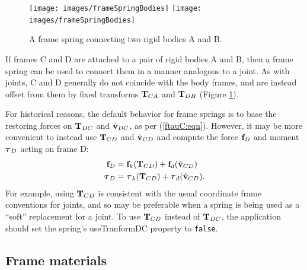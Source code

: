 \begin{figure}[ht]
\begin{center}
 \iflatexml
   \texttt{[image: images/frameSpringBodies]}
 \else
   \texttt{[image: images/frameSpringBodies]}
 \fi
\end{center}
\caption{A frame spring connecting two rigid bodies A and B.}
\label{frameSpringBodies:fig}
\end{figure}

If frames C and D are attached to a pair of rigid bodies A and B, then
a frame spring can be used to connect them in a manner analogous to a
joint. As with joints, C and D generally do not coincide with the body
frames, and are instead offset from them by fixed transforms ${\bf T}_{CA}$
and ${\bf T}_{DB}$ (Figure \ref{frameSpringBodies:fig}).

\begin{sideblock}

For historical reasons, the default behavior for frame springs is to base the
restoring forces on ${\bf T}_{DC}$ and $\hat{{\bf v}}_{DC}$, as per (\ref{ftauC:eqn}).
However, it may be more convenient to instead use ${\bf T}_{CD}$ and $\hat{{\bf v}}_{CD}$
and compute the force ${\bf f}_D$ and moment $\boldsymbol\tau_D$ acting on frame D:
%
\begin{align}
{\bf f}_D & = {\bf f}_{k} ({\bf T}_{CD}) + {\bf f}_{d} (\hat{{\bf v}}_{CD}) \notag \\
\boldsymbol\tau_D & = \boldsymbol\tau_{k} ({\bf T}_{CD}) + \boldsymbol\tau_{d} (\hat{{\bf v}}_{CD}).
\label{ftauD:eqn}
\end{align}
%
For example, using ${\bf T}_{CD}$ is consistent with the usual coordinate frame
conventions for joints, and so may be preferable when a spring is being used as
a ``soft'' replacement for a joint.  To use ${\bf T}_{CD}$ instead of ${\bf T}_{DC}$, the
application should set the spring's {\sf useTranformDC} property to {\tt false}.
\end{sideblock}

\subsection{Frame materials}

